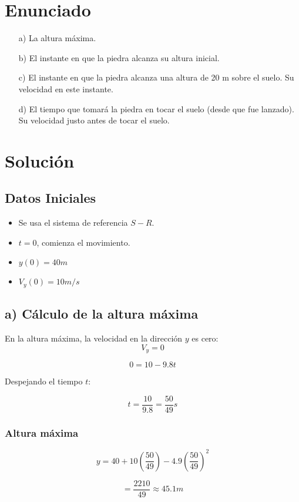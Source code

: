 \section*{Enunciado}
\begin{enumerate}
    \item[a)] La altura máxima.
    \item[b)] El instante en que la piedra alcanza su altura inicial.
    \item[c)] El instante en que la piedra alcanza una altura de 20 m sobre el suelo. Su velocidad en este instante.
    \item[d)] El tiempo que tomará la piedra en tocar el suelo (desde que fue lanzado). Su velocidad justo antes de tocar el suelo.
\end{enumerate}

\section*{Solución}

\subsection*{Datos Iniciales}
\begin{itemize}
    \item Se usa el sistema de referencia $S-R$.
    \item $t = 0$, comienza el movimiento.
    \item $y(0) = 40m$
    \item $V_y(0) = 10m/s$
\end{itemize}

\subsection*{a) Cálculo de la altura máxima}
En la altura máxima, la velocidad en la dirección $y$ es cero:
\[
V_y = 0
\]

\[
0 = 10 - 9.8t
\]

Despejando el tiempo $t$:

\[
t = \frac{10}{9.8} = \frac{50}{49} s
\]

\subsubsection*{Altura máxima}
\[
y = 40 + 10 \left(\frac{50}{49} \right) - 4.9 \left(\frac{50}{49} \right)^2
\]

\[
= \frac{2210}{49} \approx 45.1 m
\]

